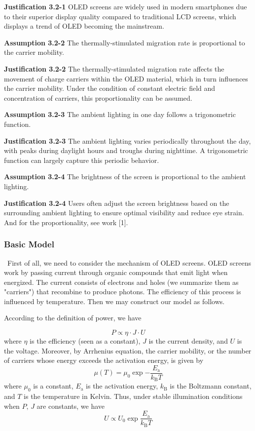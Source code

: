 \documentclass[12pt]{article}
\begin{document}
\noindent \textbf{Justification 3.2-1} \quad OLED screens are widely used in modern smartphones due to their superior display quality compared to traditional LCD screens, which displays a trend of OLED becoming the mainstream.

\noindent \textbf{Assumption 3.2-2} \quad The thermally-stimulated migration rate is proportional to the carrier mobility.

\noindent \textbf{Justification 3.2-2} \quad The thermally-stimulated migration rate affects the movement of charge carriers within the OLED material, which in turn influences the carrier mobility. Under the condition of constant electric field and concentration of carriers, this proportionality can be assumed.

\noindent \textbf{Assumption 3.2-3} \quad The ambient lighting in one day follows a trigonometric function.

\noindent \textbf{Justification 3.2-3} \quad The ambient lighting varies periodically throughout the day, with peaks during daylight hours and troughs during nighttime. A trigonometric function can largely capture this periodic behavior.

\noindent \textbf{Assumption 3.2-4} \quad The brightness of the screen is proportional to the ambient lighting.

\noindent \textbf{Justification 3.2-4} \quad Users often adjust the screen brightness based on the surrounding ambient lighting to ensure optimal visibility and reduce eye strain. And for the proportionality, see work [1].

\subsubsection{Basic Model}

\quad \, First of all, we need to consider the mechanism of OLED screens. OLED screens work by passing current through organic compounds that emit light when energized. The current consists of electrons and holes (we summarize them as "carriers") that recombine to produce photons. The efficiency of this process is influenced by temperature. Then we may construct our model as follows.

According to the definition of power, we have

\begin{equation}
	P\propto \eta\cdot J\cdot U
\end{equation}
where $\eta$ is the efficiency (seen as a constant), $J$ is the current density, and $U$ is the voltage. Moreover, by Arrhenius equation, the carrier mobility, or the number of carriers whose energy exceeds the activation energy, is given by
\begin{equation}
	\mu(T)=\mu_0 \exp{-\frac{E_\mathrm{a}}{k_\mathrm B T}}
\end{equation}
where $\mu_0$ is a constant, $E_\mathrm{a}$ is the activation energy, $k_\mathrm B$ is the Boltzmann constant, and $T$ is the temperature in Kelvin. Thus, under stable illumination conditions when $P,\,J$ are constants, we have
\begin{equation}
	U\propto U_0\exp{\frac{E_\mathrm{a}}{k_\mathrm B T}}
\end{equation}
\end{document}
